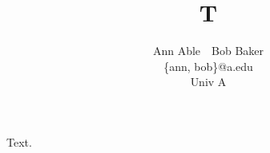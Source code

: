 \documentclass{article}
\title{T}
\author{\begin{tabular}{ccc}
Ann Able & \mbox{\ \ } & Bob Baker\\
\multicolumn{3}{c}{\{ann, bob\}@a.edu}\\
\multicolumn{3}{c}{Univ A}
\end{tabular}}
\begin{document}
\maketitle
Text.
\end{document}
